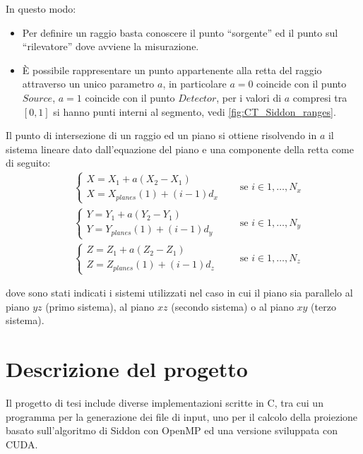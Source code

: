 \documentclass[12pt,a4paper]{report}
\begin{document}
In questo modo:
\begin{itemize}
  \item Per definire un raggio basta conoscere il punto ``sorgente'' ed il punto sul ``rilevatore'' dove avviene la misurazione.
  \item È possibile rappresentare un punto appartenente alla retta del raggio attraverso un unico parametro \(a\), in particolare
        \(a = 0\) coincide con il punto \(Source\), \(a = 1\) coincide con il punto \(Detector\), per i valori di \(a\) compresi
        tra \([0, 1]\) si hanno punti interni al segmento, vedi \autoref{fig:CT_Siddon_ranges}.
\end{itemize}

Il punto di intersezione di un raggio ed un piano si ottiene risolvendo in \(a\) il sistema lineare dato dall'equazione del
piano e una componente della retta come di seguito:
\begin{equation}
  \begin{aligned}
    &\begin{cases}
      X = X_1 + a (X_2 - X_1) \\
      X = X_{planes}(1) + (i - 1) d_x
    \end{cases} \quad &\text{se } i \in 1, \dots, N_x \\
    &\begin{cases}
      Y = Y_1 + a (Y_2 - Y_1) \\
      Y = Y_{planes}(1) + (i - 1) d_y
    \end{cases} \quad &\text{se } i \in 1, \dots, N_y \\
    &\begin{cases}
      Z = Z_1 + a (Z_2 - Z_1) \\
      Z = Z_{planes}(1) + (i - 1) d_z
    \end{cases} \quad &\text{se } i \in 1, \dots, N_z
  \end{aligned} \nonumber
\end{equation}

dove sono stati indicati i sistemi utilizzati nel caso in cui il piano sia parallelo al piano \(yz\) (primo sistema), al piano
\(xz\) (secondo sistema) o al piano \(xy\) (terzo sistema).

\chapter{Descrizione del progetto}

Il progetto di tesi include diverse implementazioni scritte in C, tra cui un programma per la generazione dei file di input, uno
per il calcolo della proiezione basato sull'algoritmo di Siddon con OpenMP ed una versione sviluppata con CUDA.
\end{document}
